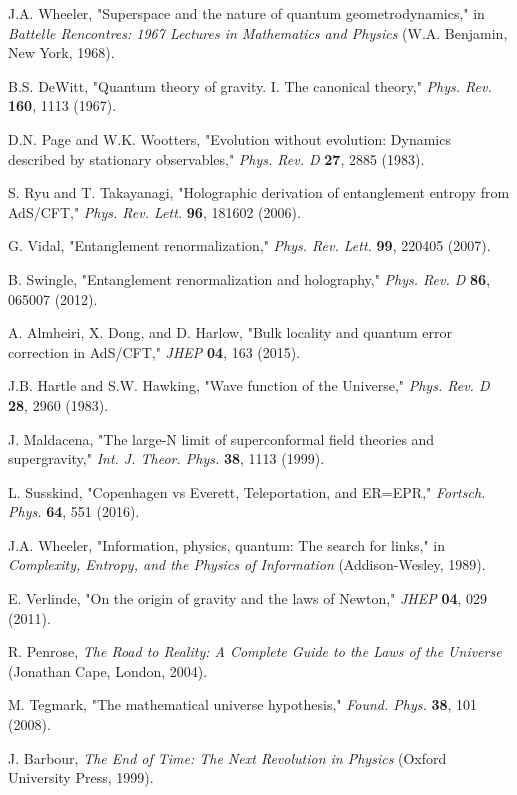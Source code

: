 \documentclass[12pt,a4paper]{article}
\begin{document}
\begin{thebibliography}{99}

 J.A. Wheeler, "Superspace and the nature of quantum geometrodynamics," in \emph{Battelle Rencontres: 1967 Lectures in Mathematics and Physics} (W.A. Benjamin, New York, 1968).

 B.S. DeWitt, "Quantum theory of gravity. I. The canonical theory," \emph{Phys. Rev.} \textbf{160}, 1113 (1967).

 D.N. Page and W.K. Wootters, "Evolution without evolution: Dynamics described by stationary observables," \emph{Phys. Rev. D} \textbf{27}, 2885 (1983).

 S. Ryu and T. Takayanagi, "Holographic derivation of entanglement entropy from AdS/CFT," \emph{Phys. Rev. Lett.} \textbf{96}, 181602 (2006).

 G. Vidal, "Entanglement renormalization," \emph{Phys. Rev. Lett.} \textbf{99}, 220405 (2007).

 B. Swingle, "Entanglement renormalization and holography," \emph{Phys. Rev. D} \textbf{86}, 065007 (2012).

 A. Almheiri, X. Dong, and D. Harlow, "Bulk locality and quantum error correction in AdS/CFT," \emph{JHEP} \textbf{04}, 163 (2015).

 J.B. Hartle and S.W. Hawking, "Wave function of the Universe," \emph{Phys. Rev. D} \textbf{28}, 2960 (1983).

 J. Maldacena, "The large-N limit of superconformal field theories and supergravity," \emph{Int. J. Theor. Phys.} \textbf{38}, 1113 (1999).

 L. Susskind, "Copenhagen vs Everett, Teleportation, and ER=EPR," \emph{Fortsch. Phys.} \textbf{64}, 551 (2016).

 J.A. Wheeler, "Information, physics, quantum: The search for links," in \emph{Complexity, Entropy, and the Physics of Information} (Addison-Wesley, 1989).

 E. Verlinde, "On the origin of gravity and the laws of Newton," \emph{JHEP} \textbf{04}, 029 (2011).

 R. Penrose, \emph{The Road to Reality: A Complete Guide to the Laws of the Universe} (Jonathan Cape, London, 2004).

 M. Tegmark, "The mathematical universe hypothesis," \emph{Found. Phys.} \textbf{38}, 101 (2008).

 J. Barbour, \emph{The End of Time: The Next Revolution in Physics} (Oxford University Press, 1999).

\end{thebibliography}
\end{document}
